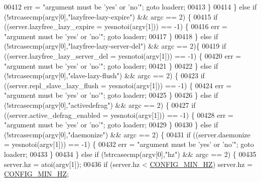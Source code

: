 \begin{DoxyCode}
{{00412                 err = \textcolor{stringliteral}{"argument must be 'yes' or 'no'"}; \textcolor{keywordflow}{goto} loaderr;
00413             \}
00414         \} \textcolor{keywordflow}{else} \textcolor{keywordflow}{if} (!strcasecmp(argv[0],\textcolor{stringliteral}{"lazyfree-lazy-expire"}) && argc == 2) \{
00415             \textcolor{keywordflow}{if} ((server.lazyfree\_lazy\_expire = yesnotoi(argv[1])) == -1) \{
00416                 err = \textcolor{stringliteral}{"argument must be 'yes' or 'no'"}; \textcolor{keywordflow}{goto} loaderr;
00417             \}
00418         \} \textcolor{keywordflow}{else} \textcolor{keywordflow}{if} (!strcasecmp(argv[0],\textcolor{stringliteral}{"lazyfree-lazy-server-del"}) && argc == 2)\{
00419             \textcolor{keywordflow}{if} ((server.lazyfree\_lazy\_server\_del = yesnotoi(argv[1])) == -1) \{
00420                 err = \textcolor{stringliteral}{"argument must be 'yes' or 'no'"}; \textcolor{keywordflow}{goto} loaderr;
00421             \}
00422         \} \textcolor{keywordflow}{else} \textcolor{keywordflow}{if} (!strcasecmp(argv[0],\textcolor{stringliteral}{"slave-lazy-flush"}) && argc == 2) \{
00423             \textcolor{keywordflow}{if} ((server.repl\_slave\_lazy\_flush = yesnotoi(argv[1])) == -1) \{
00424                 err = \textcolor{stringliteral}{"argument must be 'yes' or 'no'"}; \textcolor{keywordflow}{goto} loaderr;
00425             \}
00426         \} \textcolor{keywordflow}{else} \textcolor{keywordflow}{if} (!strcasecmp(argv[0],\textcolor{stringliteral}{"activedefrag"}) && argc == 2) \{
00427             \textcolor{keywordflow}{if} ((server.active\_defrag\_enabled = yesnotoi(argv[1])) == -1) \{
00428                 err = \textcolor{stringliteral}{"argument must be 'yes' or 'no'"}; \textcolor{keywordflow}{goto} loaderr;
00429             \}
00430         \} \textcolor{keywordflow}{else} \textcolor{keywordflow}{if} (!strcasecmp(argv[0],\textcolor{stringliteral}{"daemonize"}) && argc == 2) \{
00431             \textcolor{keywordflow}{if} ((server.daemonize = yesnotoi(argv[1])) == -1) \{
00432                 err = \textcolor{stringliteral}{"argument must be 'yes' or 'no'"}; \textcolor{keywordflow}{goto} loaderr;
00433             \}
00434         \} \textcolor{keywordflow}{else} \textcolor{keywordflow}{if} (!strcasecmp(argv[0],\textcolor{stringliteral}{"hz"}) && argc == 2) \{
00435             server.hz = atoi(argv[1]);
00436             \textcolor{keywordflow}{if} (server.hz < \hyperlink{server_8h_aba98a7c0e14b8f68e19c43e3e0334fc2}{CONFIG\_MIN\_HZ}) server.hz = 
      \hyperlink{server_8h_aba98a7c0e14b8f68e19c43e3e0334fc2}{CONFIG\_MIN\_HZ};
}}
\end{DoxyCode}
